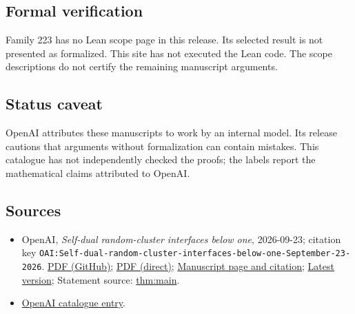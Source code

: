 \documentclass[11pt]{article}
\begin{document}
\subsection{Formal verification}
Family 223 has no Lean scope page in this release. Its selected result is not presented as formalized. This site has not executed the Lean code. The scope descriptions do not certify the remaining manuscript arguments.

\subsection{Status caveat}
OpenAI attributes these manuscripts to work by an internal model. Its release cautions that arguments without formalization can contain mistakes. This catalogue has not independently checked the proofs; the labels report the mathematical claims attributed to OpenAI.

\subsection{Sources}
\begin{itemize}
\item OpenAI, \emph{Self-dual random-cluster interfaces below one}, 2026-09-23; citation key \texttt{OAI:Self-dual-random-cluster-interfaces-below-one-September-23-2026}. \href{https://github.com/openai/math/blob/adc7f1241b42e322a6451854ab7e4b4c146bf78a/preprints/Self-dual-random-cluster-interfaces-below-one-September-23-2026/paper.pdf}{PDF (GitHub)}; \href{https://github.com/openai/math/raw/adc7f1241b42e322a6451854ab7e4b4c146bf78a/preprints/Self-dual-random-cluster-interfaces-below-one-September-23-2026/paper.pdf}{PDF (direct)}; \href{https://github.com/openai/math/blob/adc7f1241b42e322a6451854ab7e4b4c146bf78a/preprints/Self-dual-random-cluster-interfaces-below-one-September-23-2026/README.md}{Manuscript page and citation}; \href{https://github.com/openai/math/blob/main/preprints/Self-dual-random-cluster-interfaces-below-one-September-23-2026/paper.pdf}{Latest version}; Statement source: \href{https://github.com/openai/math/blob/adc7f1241b42e322a6451854ab7e4b4c146bf78a/preprints/Self-dual-random-cluster-interfaces-below-one-September-23-2026/build/sections/00-introduction.tex\#L83}{thm:main}.
\item \href{https://github.com/openai/math/blob/adc7f1241b42e322a6451854ab7e4b4c146bf78a/CONTENTS.md}{OpenAI catalogue entry}.
\end{itemize}
\end{document}
